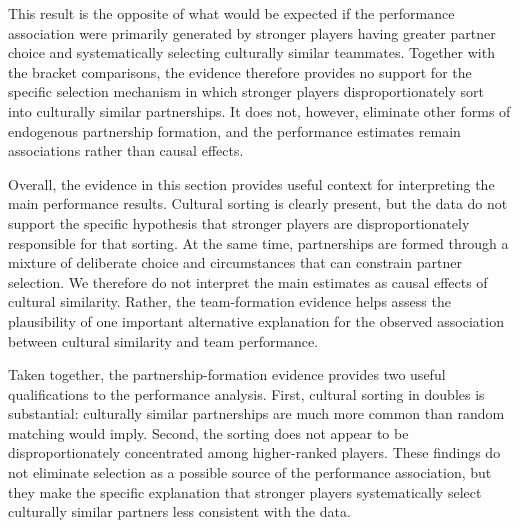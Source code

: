 \documentclass[10pt]{article}
\begin{document}

This result is the opposite of what would be expected if the performance association were primarily generated by stronger players having greater partner choice and systematically selecting culturally similar teammates. Together with the bracket comparisons, the evidence therefore provides no support for the specific selection mechanism in which stronger players disproportionately sort into culturally similar partnerships. It does not, however, eliminate other forms of endogenous partnership formation, and the performance estimates remain associations rather than causal effects.

Overall, the evidence in this section provides useful context for interpreting the main performance results. Cultural sorting is clearly present, but the data do not support the specific hypothesis that stronger players are disproportionately responsible for that sorting. At the same time, partnerships are formed through a mixture of deliberate choice and circumstances that can constrain partner selection. We therefore do not interpret the main estimates as causal effects of cultural similarity. Rather, the team-formation evidence helps assess the plausibility of one important alternative explanation for the observed association between cultural similarity and team performance.

Taken together, the partnership-formation evidence provides two useful qualifications to the performance analysis. First, cultural sorting in doubles is substantial: culturally similar partnerships are much more common than random matching would imply. Second, the sorting does not appear to be disproportionately concentrated among higher-ranked players. These findings do not eliminate selection as a possible source of the performance association, but they make the specific explanation that stronger players systematically select culturally similar partners less consistent with the data.
\end{document}
